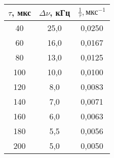 \begin{tabular}{ccc}
\toprule
$\tau$, мкс & $\Delta \nu$, кГц & $\frac{1}{\tau}, \text{мкс}^{-1}$\\
\midrule
40  & 25,0 & 0,0250 \\
60  & 16,0 & 0,0167 \\
80  & 13,0 & 0,0125 \\
100 & 10,0 & 0,0100 \\
120 & 8,0  & 0,0083 \\
140 & 7,0  & 0,0071 \\
160 & 6,0  & 0,0063 \\
180 & 5,5  & 0,0056 \\
200 & 5,0  & 0,0050 \\
\bottomrule
\end{tabular}